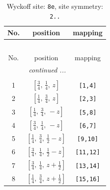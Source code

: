 \documentclass[fleqn,8pt]{jsarticle}
\begin{document}
\renewcommand{\arraystretch}{1.2}
\begin{longtable}{ccc}
\caption{Wyckoff site: {\tt 8e}, site symmetry: {\tt 2..}}
 \\
 \hline \hline
No. & position & mapping \\ \hline \endfirsthead

\multicolumn{2}{l}{\tablename\ \thetable{}} \\
 \hline \hline
No. & position & mapping \\ \hline \endhead

 \hline \hline
\multicolumn{2}{r}{\footnotesize\it continued ...} \\ \endfoot

 \hline \hline
\multicolumn{2}{r}{} \\ \endlastfoot

1 & $\left[ \frac{3}{4},\, \frac{1}{4},\, z \right]$ & {\tt [1,4]} \\ \hline
2 & $\left[ \frac{1}{4},\, \frac{3}{4},\, z \right]$ & {\tt [2,3]} \\ \hline
3 & $\left[ \frac{1}{4},\, \frac{3}{4},\, - z \right]$ & {\tt [5,8]} \\ \hline
4 & $\left[ \frac{3}{4},\, \frac{1}{4},\, - z \right]$ & {\tt [6,7]} \\ \hline
5 & $\left[ \frac{1}{4},\, \frac{3}{4},\, \frac{1}{2} - z \right]$ & {\tt [9,10]} \\ \hline
6 & $\left[ \frac{3}{4},\, \frac{1}{4},\, \frac{1}{2} - z \right]$ & {\tt [11,12]} \\ \hline
7 & $\left[ \frac{3}{4},\, \frac{1}{4},\, z + \frac{1}{2} \right]$ & {\tt [13,14]} \\ \hline
8 & $\left[ \frac{1}{4},\, \frac{3}{4},\, z + \frac{1}{2} \right]$ & {\tt [15,16]} \\
\end{longtable}
\renewcommand{\arraystretch}{1.2}
\end{document}
